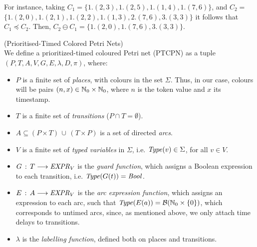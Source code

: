 \begin{definition}
\begin{itemize}
\begin{itemize}
        \vspace*{0.12cm}

        For instance, taking $C_1 = \{
             1.(2,3), 1.(2,5), 1.(1,4), 1.(7,6)
        \}$, and $C_2 = $ \linebreak
        $\{
             1.(2,0), 1.(2,1), 1.(2,2), 1.(1,3), 2.(7,6), 3.(3,3)
        \}$ it follows that $C_1 \preceq C_2$. Then,
        $C_2 \ominus C_1= \{
            1.(2,0), 1.(7,6), 3.(3,3)
        \}$.
  \end{itemize} 
\end{itemize}
\end{definition}

\begin{definition} (Prioritised-Timed Colored Petri Nets)\\
We define a prioritized-timed coloured Petri net (PTCPN)
as a tuple $(P,T,A,V,G,E,\lambda,D,\pi)$, where: %
\begin{itemize}
\item $P$ is a finite set of {\em places}, with colours
in the set $\Sigma$. Thus, in our case, colours 
will be pairs $(n,x)\in \mathbb{N}_{0} \times \mathbb{N}_{0}$, where $n$ is
the token value and $x$ its timestamp.
%
\item $T$ is a finite set of {\em transitions} ($P\cap T = \emptyset$).
%
\item $A \subseteq (P\times T)\,\cup\,(T \times P)$ is a
set of directed {\em arcs}.
%
%
\item $V$ is a finite set of {\em typed variables} in $\Sigma$, 
i.e. ${\it Type}(v) \in \Sigma$, for all $v \in V$.
%
%
\item $G\,:\, T \longrightarrow {\it EXPR}_V$ is the
{\em guard function}, which assigns a Boolean
expression
to each transition, i.e. ${\it Type}(G(t))={\it Bool}$. 
%
\item $E\,:\, A \longrightarrow {\it EXPR}_V$ is the
{\em arc expression function}, which assigns an expression
to each arc, such that ${\it Type}(E(a)) = {\cal B}(\mathbb{N}_{0} \times \{0\})$,
which corresponds to untimed arcs, since, as mentioned above,
we only attach time delays to transitions.
%
%
\item $\lambda$ is the {\em labelling function}, defined
both on places and transitions.
%

\end{itemize}
\end{definition}
